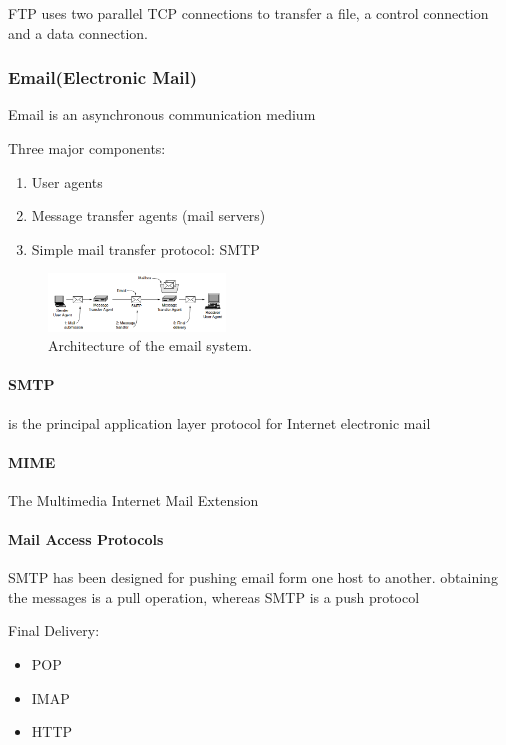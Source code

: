 FTP uses two parallel TCP connections to transfer a file, a
control connection and a data connection.

\subsubsection{Email(Electronic Mail)}
Email is an asynchronous communication medium

Three major components:
\begin{enumerate}
    \item User agents
    \item Message transfer agents (mail servers)
    \item Simple mail transfer protocol: SMTP
\end{enumerate}

\begin{figure}[!htb]
    \centering
    \includegraphics[width=0.42\textwidth]{pic/CN7/Architecture of the email system.}
    \caption{Architecture of the email system.}
\end{figure}

\paragraph{SMTP} is the principal application layer protocol for Internet electronic mail

\paragraph{MIME}The Multimedia Internet Mail Extension

\paragraph{Mail Access Protocols}SMTP has been designed for pushing email form one host to another. obtaining the messages is a pull operation,
whereas SMTP is a push protocol

Final Delivery:
\begin{itemize}
    \item POP
    \item IMAP
    \item HTTP
\end{itemize}

